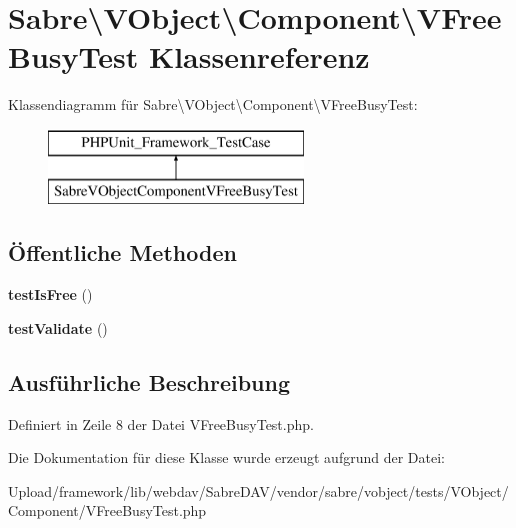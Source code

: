 \hypertarget{class_sabre_1_1_v_object_1_1_component_1_1_v_free_busy_test}{}\section{Sabre\textbackslash{}V\+Object\textbackslash{}Component\textbackslash{}V\+Free\+Busy\+Test Klassenreferenz}
\label{class_sabre_1_1_v_object_1_1_component_1_1_v_free_busy_test}
Klassendiagramm für Sabre\textbackslash{}V\+Object\textbackslash{}Component\textbackslash{}V\+Free\+Busy\+Test\+:\begin{figure}[H]
\begin{center}
\leavevmode
\includegraphics[height=2.000000cm]{class_sabre_1_1_v_object_1_1_component_1_1_v_free_busy_test}
\end{center}
\end{figure}
\subsection*{Öffentliche Methoden}
\begin{DoxyCompactItemize}
\item 
\mbox{\label{class_sabre_1_1_v_object_1_1_component_1_1_v_free_busy_test_a8ba5bd4b88869da50a06a1c560bd5fab}} 
{\bfseries test\+Is\+Free} ()
\item 
\mbox{\label{class_sabre_1_1_v_object_1_1_component_1_1_v_free_busy_test_a91e14c1a3499b03e1e685dfcdd86899f}} 
{\bfseries test\+Validate} ()
\end{DoxyCompactItemize}


\subsection{Ausführliche Beschreibung}


Definiert in Zeile 8 der Datei V\+Free\+Busy\+Test.\+php.



Die Dokumentation für diese Klasse wurde erzeugt aufgrund der Datei\+:\begin{DoxyCompactItemize}
\item 
Upload/framework/lib/webdav/\+Sabre\+D\+A\+V/vendor/sabre/vobject/tests/\+V\+Object/\+Component/V\+Free\+Busy\+Test.\+php\end{DoxyCompactItemize}
